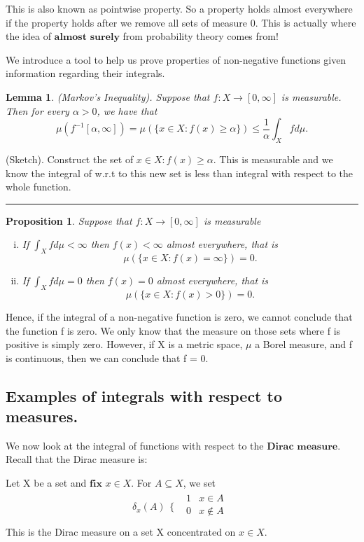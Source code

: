 \documentclass[twoside]{article}
\newtheorem{lemma}[theorem]{Lemma}
\newtheorem{proposition}[theorem]{Proposition}
\newenvironment{proof}{{\bf Proof:}}{\hfill\rule{2mm}{2mm}}
\begin{document}
This is also known as pointwise property. So a property holds almost everywhere if the property holds after we remove all sets of measure 0. This is actually where the idea of $\textbf{almost surely}$ from probability theory comes from!

We introduce a tool to help us prove properties of non-negative functions given information regarding their integrals.
\begin{lemma}
(Markov's Inequality). Suppose that $f: X \rightarrow [0, \infty]$ is measurable. Then for every $\alpha > 0$, we have that
$$
\mu(f^{-1}[\alpha, \infty]) = \mu(\{x \in X: f(x) \geq \alpha \}) \leq \frac{1}{\alpha}\int_Xfd\mu.
$$
\end{lemma}

\begin{proof}
(Sketch). Construct the set of $x \in X: f(x) \geq \alpha$. This is measurable and we know the integral of w.r.t to this new set is less than integral with respect to the whole function.
\end{proof}

\begin{proposition}
Suppose that $f: X \rightarrow [0, \infty]$ is measurable
\begin{enumerate}[(i)]
    \item If $\int_Xfd\mu < \infty$ then $f(x) < \infty$ almost everywhere, that is
    $$
    \mu(\{x \in X: f(x) = \infty\}) = 0.
    $$
    \item If $\int_Xfd\mu = 0$ then $f(x) = 0$ almost everywhere, that is
    $$
    \mu(\{x \in X: f(x) > 0\}) = 0.
    $$
\end{enumerate}
\end{proposition}

Hence, if the integral of a non-negative function is zero, we cannot conclude that the function f is zero. We only know that the measure on those sets where f is positive is simply zero. However, if X is a metric space, $\mu$ a Borel measure, and f is continuous, then we can conclude that f = 0.
\subsection{Examples of integrals with respect to measures.}
We now look at the integral of functions with respect to the $\textbf{Dirac measure}$. Recall that the Dirac measure is:

Let X be a set and $\textbf{fix}$ $x \in X$. For $A \subseteq X$, we set
$$
\delta_x(A) 
\begin{array}{cc}
  \{ & 
    \begin{array}{cc}
      1 & x \in A \\
      0 & x \not\in A \\
    \end{array}
\end{array}
$$
This is the Dirac measure on a set X concentrated on $x \in X$. 
\end{document}
